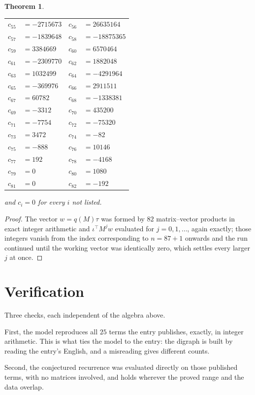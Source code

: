 \documentclass[11pt,a4paper]{article}
\theoremstyle{plain}
\newtheorem{theorem}{Theorem}
\theoremstyle{definition}
\begin{document}
\begin{theorem}
\begin{center}
\begin{tabular}{r@{\,}l@{\qquad}r@{\,}l}
$c_{55}$ & $=-2715673$ & $c_{56}$ & $=26635164$ \\
$c_{57}$ & $=-1839648$ & $c_{58}$ & $=-18875365$ \\
$c_{59}$ & $=3384669$ & $c_{60}$ & $=6570464$ \\
$c_{61}$ & $=-2309770$ & $c_{62}$ & $=1882048$ \\
$c_{63}$ & $=1032499$ & $c_{64}$ & $=-4291964$ \\
$c_{65}$ & $=-369976$ & $c_{66}$ & $=2911511$ \\
$c_{67}$ & $=60782$ & $c_{68}$ & $=-1338381$ \\
$c_{69}$ & $=-3312$ & $c_{70}$ & $=435200$ \\
$c_{71}$ & $=-7754$ & $c_{72}$ & $=-75320$ \\
$c_{73}$ & $=3472$ & $c_{74}$ & $=-82$ \\
$c_{75}$ & $=-888$ & $c_{76}$ & $=10146$ \\
$c_{77}$ & $=192$ & $c_{78}$ & $=-4168$ \\
$c_{79}$ & $=0$ & $c_{80}$ & $=1080$ \\
$c_{81}$ & $=0$ & $c_{82}$ & $=-192$ \\
\end{tabular}
\end{center}
and $c_i=0$ for every $i$ not listed.
\end{theorem}

\begin{proof}
The vector $w=q(M)\tau$ was formed by $82$ matrix--vector products in exact integer
arithmetic and $\iota^{\!\top}M^{j}w$ evaluated for $j=0,1,\dots$, again exactly; those
integers vanish from the index corresponding to $n=87+1$ onwards and the run continued
until the working vector was identically zero, which settles every larger $j$ at once.
\end{proof}

\section{Verification}

Three checks, each independent of the algebra above.

First, the model reproduces all $25$ terms the entry publishes, exactly, in integer
arithmetic. This is what ties the model to the entry: the digraph is built by reading the
entry's English, and a misreading gives different counts.

Second, the conjectured recurrence was evaluated directly on those published terms, with no
matrices involved, and holds wherever the proved range and the data overlap.
\end{document}
